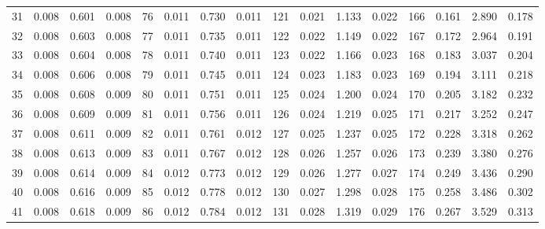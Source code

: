 \begin{table}[!h]
{\begin{tabular}{rrrr|rrrr|rrrr|crrr}
 31 & \tiny{  0.008} &   0.601 & \tiny{  0.008} &  76 & \tiny{  0.011} &   0.730 & \tiny{  0.011} & 121 & \tiny{  0.021} &   1.133 & \tiny{  0.022} & 166 & \tiny{  0.161} &   2.890 & \tiny{  0.178}\\
 32 & \tiny{  0.008} &   0.603 & \tiny{  0.008} &  77 & \tiny{  0.011} &   0.735 & \tiny{  0.011} & 122 & \tiny{  0.022} &   1.149 & \tiny{  0.022} & 167 & \tiny{  0.172} &   2.964 & \tiny{  0.191}\\
 33 & \tiny{  0.008} &   0.604 & \tiny{  0.008} &  78 & \tiny{  0.011} &   0.740 & \tiny{  0.011} & 123 & \tiny{  0.022} &   1.166 & \tiny{  0.023} & 168 & \tiny{  0.183} &   3.037 & \tiny{  0.204}\\
 34 & \tiny{  0.008} &   0.606 & \tiny{  0.008} &  79 & \tiny{  0.011} &   0.745 & \tiny{  0.011} & 124 & \tiny{  0.023} &   1.183 & \tiny{  0.023} & 169 & \tiny{  0.194} &   3.111 & \tiny{  0.218}\\
 35 & \tiny{  0.008} &   0.608 & \tiny{  0.009} &  80 & \tiny{  0.011} &   0.751 & \tiny{  0.011} & 125 & \tiny{  0.024} &   1.200 & \tiny{  0.024} & 170 & \tiny{  0.205} &   3.182 & \tiny{  0.232}\\
 36 & \tiny{  0.008} &   0.609 & \tiny{  0.009} &  81 & \tiny{  0.011} &   0.756 & \tiny{  0.011} & 126 & \tiny{  0.024} &   1.219 & \tiny{  0.025} & 171 & \tiny{  0.217} &   3.252 & \tiny{  0.247}\\
 37 & \tiny{  0.008} &   0.611 & \tiny{  0.009} &  82 & \tiny{  0.011} &   0.761 & \tiny{  0.012} & 127 & \tiny{  0.025} &   1.237 & \tiny{  0.025} & 172 & \tiny{  0.228} &   3.318 & \tiny{  0.262}\\
 38 & \tiny{  0.008} &   0.613 & \tiny{  0.009} &  83 & \tiny{  0.011} &   0.767 & \tiny{  0.012} & 128 & \tiny{  0.026} &   1.257 & \tiny{  0.026} & 173 & \tiny{  0.239} &   3.380 & \tiny{  0.276}\\
 39 & \tiny{  0.008} &   0.614 & \tiny{  0.009} &  84 & \tiny{  0.012} &   0.773 & \tiny{  0.012} & 129 & \tiny{  0.026} &   1.277 & \tiny{  0.027} & 174 & \tiny{  0.249} &   3.436 & \tiny{  0.290}\\
 40 & \tiny{  0.008} &   0.616 & \tiny{  0.009} &  85 & \tiny{  0.012} &   0.778 & \tiny{  0.012} & 130 & \tiny{  0.027} &   1.298 & \tiny{  0.028} & 175 & \tiny{  0.258} &   3.486 & \tiny{  0.302}\\
 41 & \tiny{  0.008} &   0.618 & \tiny{  0.009} &  86 & \tiny{  0.012} &   0.784 & \tiny{  0.012} & 131 & \tiny{  0.028} &   1.319 & \tiny{  0.029} & 176 & \tiny{  0.267} &   3.529 & \tiny{  0.313}\\

\end{tabular}}
\end{table}
